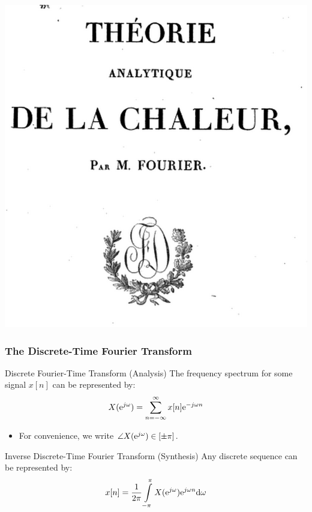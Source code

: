 \documentclass[mathserif,9pt]{beamer}
\def\d{\mathrm{d}}
\begin{document}
\begin{frame}
\begin{center}
     \includegraphics[height=.4\textheight]{f4.png}\hspace{1em} 
  \end{center}
\end{frame}


\begin{frame}\frametitle{The Discrete-Time Fourier Transform}
   
   \begin{block}{Discrete Fourier-Time Transform (Analysis)}
   The frequency spectrum for some signal $x[n]$ can be represented by: 
   \begin{align}
     X({\textrm{e}}^{j\omega}) = \sum_{n=-\infty}^{\infty} x[n] {\textrm{e}}^{-j\omega n}
     \nonumber
   \end{align}
   \begin{itemize}
     \item For convenience, we write $\angle X({\textrm{e}}^{j\omega}) \in [\pm\pi]$. 
   \end{itemize}
   \end{block}
   
   \begin{exampleblock}{Inverse Discrete-Time Fourier Transform (Synthesis)}
   Any discrete sequence can be represented by: 
   \begin{align}
     x[n] = \frac{1}{2\pi} \int\limits_{-\pi}^{\pi} X(\e^{j\omega}) \e^{j\omega n} \d\omega
     \nonumber
   \end{align}
   \end{exampleblock}
\end{frame}
\end{document}

